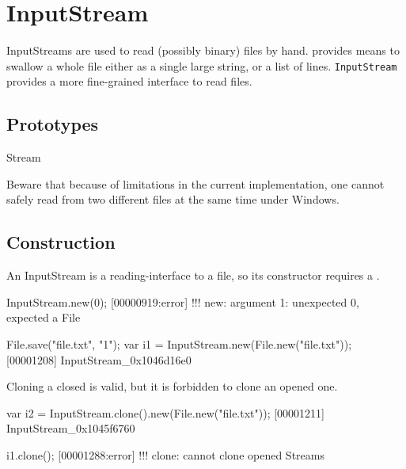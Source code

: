 
\section{InputStream}

InputStreams are used to read (possibly binary) files by hand.
 provides means to swallow a whole file either as a
single large string, or a list of lines.  \lstinline|InputStream|
provides a more fine-grained interface to read files.

\subsection{Prototypes}
\begin{refObjects}
\item[Stream]
\end{refObjects}

\begin{windows}
  Beware that because of limitations in the current implementation,
  one cannot safely read from two different files at the same time
  under Windows.
\end{windows}

\subsection{Construction}

An InputStream is a reading-interface to a file, so its constructor
requires a .

\begin{urbiscript}[firstnumber=1]
InputStream.new(0);
[00000919:error] !!! new: argument 1: unexpected 0, expected a File

File.save("file.txt", "1\n");
var i1 = InputStream.new(File.new("file.txt"));
[00001208] InputStream_0x1046d16e0
\end{urbiscript}

Cloning a closed  is valid, but it is forbidden to clone an
opened one.

\begin{urbiscript}
var i2 = InputStream.clone().new(File.new("file.txt"));
[00001211] InputStream_0x1045f6760

i1.clone();
[00001288:error] !!! clone: cannot clone opened Streams
\end{urbiscript}

